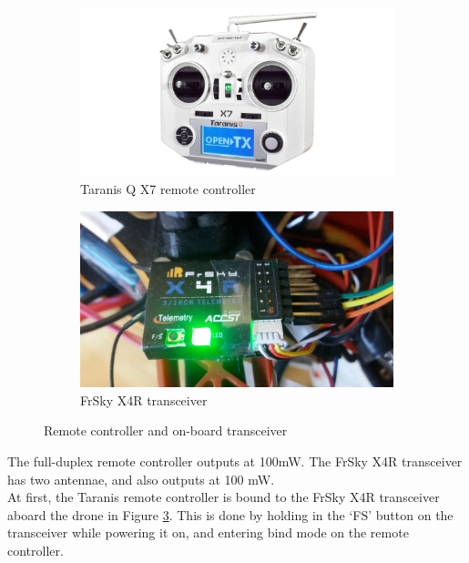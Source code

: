 \begin{figure}[H]
\begin{subfigure}{0.5\textwidth}
\centering
\includegraphics[scale=0.255]{images/taranis.png}
\caption{Taranis Q X7 remote controller}
\label{fig:remote_controller}
\end{subfigure}
\begin{subfigure}{0.5\textwidth}
\centering
\includegraphics[scale=0.15]{images/frsky_transceiver.jpg}
\caption{FrSky X4R transceiver}
\label{fig:balls}
\end{subfigure}
\caption{Remote controller and on-board transceiver}
\label{fig:frsky_transceiver}
\end{figure}

The full-duplex remote controller outputs at 100mW. The FrSky X4R transceiver has two antennae, and also outputs at 100 mW.\\

At first, the Taranis remote controller is bound to the FrSky X4R transceiver aboard the drone in Figure \ref{fig:frsky_transceiver}. This is done by holding in the `F\/S' button on the transceiver while powering it on, and entering bind mode on the remote controller.

